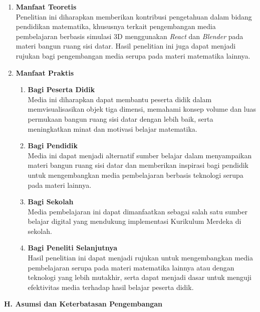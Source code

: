 \begin{enumerate}
    \item \textbf{Manfaat Teoretis} \\
    Penelitian ini diharapkan memberikan kontribusi pengetahuan dalam bidang pendidikan matematika, khususnya terkait pengembangan media pembelajaran berbasis simulasi 3D menggunakan \textit{React} dan \textit{Blender} pada materi bangun ruang sisi datar. Hasil penelitian ini juga dapat menjadi rujukan bagi pengembangan media serupa pada materi matematika lainnya.

    \item \textbf{Manfaat Praktis}
    \begin{enumerate}
        \item \textbf{Bagi Peserta Didik} \\
        Media ini diharapkan dapat membantu peserta didik dalam memvisualisasikan objek tiga dimensi, memahami konsep volume dan luas permukaan bangun ruang sisi datar dengan lebih baik, serta meningkatkan minat dan motivasi belajar matematika.
        
        \item \textbf{Bagi Pendidik} \\
        Media ini dapat menjadi alternatif sumber belajar dalam menyampaikan materi bangun ruang sisi datar dan memberikan inspirasi bagi pendidik untuk mengembangkan media pembelajaran berbasis teknologi serupa pada materi lainnya.
        
        \item \textbf{Bagi Sekolah} \\
        Media pembelajaran ini dapat dimanfaatkan sebagai salah satu sumber belajar digital yang mendukung implementasi Kurikulum Merdeka di sekolah.
        
        \item \textbf{Bagi Peneliti Selanjutnya} \\
        Hasil penelitian ini dapat menjadi rujukan untuk mengembangkan media pembelajaran serupa pada materi matematika lainnya atau dengan teknologi yang lebih mutakhir, serta dapat menjadi dasar untuk menguji efektivitas media terhadap hasil belajar peserta didik.
    \end{enumerate}
\end{enumerate}

\textbf{H. Asumsi dan Keterbatasan Pengembangan}

